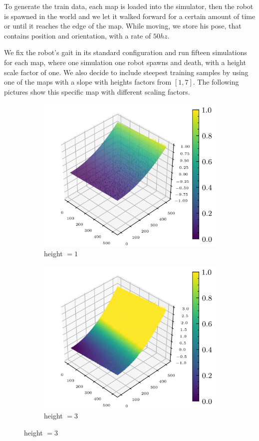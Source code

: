 \documentclass[../document.tex]{subfiles}
\begin{document}
To generate the train data, each map is loaded into the simulator, then the robot is spawned in the world and we let it walked forward for a certain amount of time or until it reaches the edge of the map. While moving, we store his pose, that contains position and orientation, with a rate of $50hz$. 

We fix the robot's gait in its standard configuration and run fifteen simulations for each map, where one simulation one robot spawns and death, with a height scale factor of one. We also decide to include steepest training samples by using one of the maps with a slope with heights factors from $[1,7]$. The following pictures show this specific map with different scaling factors. 

\begin{figure}[H]
    	\begin{subfigure}[b]{0.5\textwidth}
			\includegraphics[width=\textwidth]{../img/hm3d/slope_rocks2.png}
			\caption{height $=1$}
	    \end{subfigure}
		\begin{subfigure}[b]{0.5\textwidth}
			\includegraphics[width=\textwidth]{../img/hm3d/3-slope_rocks2.png}
			\caption{height $=3$}
	    \end{subfigure}	
	   

\end{figure}
\end{document}
